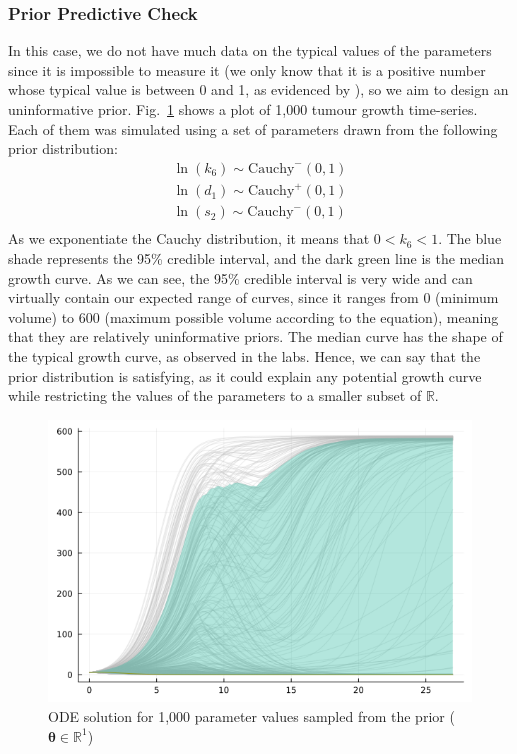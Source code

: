 \documentclass[11pt]{article}
\begin{document}
\subsubsection{Prior Predictive Check}
In this case, we do not have much data on the typical values of the parameters since it is impossible to measure it (we only know that it is a positive number whose typical value is between 0 and 1, as evidenced by \cite{christian1}), so we aim to design an uninformative prior. Fig.~\ref{fig:ppc_1} shows a plot of 1,000 tumour growth time-series. Each of them was simulated using a set of parameters drawn from the following prior distribution:
\begin{align*}
    \ln(k_6) \sim \text{Cauchy}^-(0, 1) \\ 
    \ln(d_1) \sim \text{Cauchy}^+(0, 1) \\ 
    \ln(s_2) \sim \text{Cauchy}^-(0, 1) \\ 
\end{align*} 
As we exponentiate the Cauchy distribution, it means that $0 < k_6 < 1$. The blue shade represents the 95\% credible interval, and the dark green line is the median growth curve. As we can see, the 95\% credible interval is very wide and can virtually contain our expected range of curves, since it ranges from 0 (minimum volume) to 600 (maximum possible volume according to the equation), meaning that they are relatively uninformative priors. The median curve has the shape of the typical growth curve, as observed in the labs. Hence, we can say that the prior distribution is satisfying, as it could explain any potential growth curve while restricting the values of the parameters to a smaller subset of $\mathbb{R}$.
    \begin{figure}[!ht]
        \centering\includegraphics[scale=0.4]{prout1.png}
        \caption{ODE solution for 1,000 parameter values sampled from the prior ($\boldsymbol{\theta} \in \mathbb{R}^1$)}
        \label{fig:ppc_1}
    \end{figure}
\end{document}
